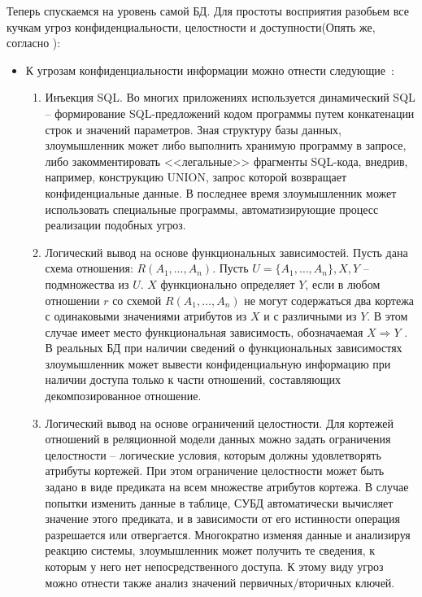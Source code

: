 Теперь спускаемся на уровень самой БД. Для простоты восприятия разобьем все кучкам угроз конфиденциальности, целостности и доступности(Опять же, согласно \autocite{Ytebov2008}):
\begin{itemize}
	\item К угрозам конфиденциальности информации можно отнести следующие~\label{ugr:conf}:
	\begin{enumerate}
		\item Инъекция SQL. Во многих приложениях используется динамический SQL -- формирование SQL-предложений кодом программы путем конкатенации строк и значений параметров. Зная структуру базы данных, злоумышленник может либо выполнить хранимую программу в запросе, либо закомментировать <<легальные>> фрагменты SQL-кода, внедрив, например, конструкцию UNION, запрос которой возвращает конфиденциальные данные. В последнее время злоумышленник может использовать специальные программы, автоматизирующие процесс реализации подобных угроз.

		\item Логический вывод на основе функциональных зависимостей. Пусть дана схема отношения: $R(A_1,\ldots,A_n)$. Пусть $U = \{A_1,\ldots,A_n\}, X ,Y$ -- подмножества из $U$. $X$ функционально определяет $Y$, если в любом отношении $r$ со схемой $R(A_1,\ldots,A_n)$ не могут содержаться два кортежа с одинаковыми значениями атрибутов из $X$ и с различными из $Y$. В этом случае имеет место функциональная зависимость, обозначаемая $X \Rightarrow Y$ . В реальных БД при наличии сведений о функциональных зависимостях злоумышленник может вывести конфиденциальную информацию при наличии доступа только к части отношений, составляющих декомпозированное отношение.

		\item Логический вывод на основе ограничений целостности. Для кортежей отношений в реляционной модели данных можно задать ограничения целостности -- логические условия, которым должны удовлетворять атрибуты кортежей. При этом ограничение целостности может быть задано в виде предиката на всем множестве атрибутов кортежа. В случае попытки изменить данные в таблице, СУБД автоматически вычисляет значение этого предиката, и в зависимости от его истинности операция разрешается или отвергается. Многократно изменяя данные и анализируя реакцию системы, злоумышленник может получить те сведения, к которым	у него нет непосредственного доступа. К этому виду угроз можно отнести также анализ значений первичных/вторичных ключей.


\end{enumerate}
\end{itemize}

